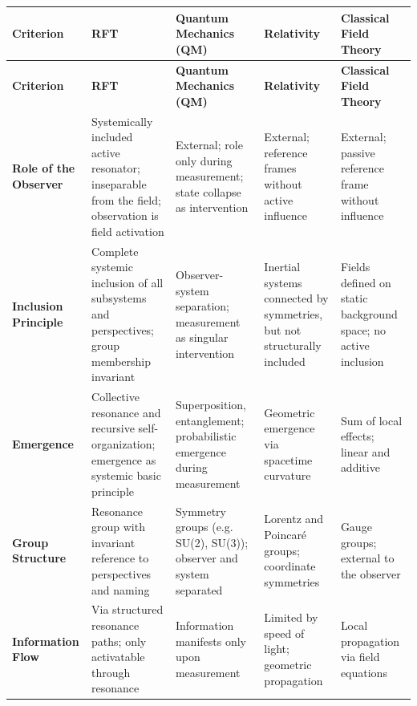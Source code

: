 \documentclass[12pt]{iopart}
\begin{document}
\renewcommand{\arraystretch}{1.3}
\begin{center}
	\begin{longtable}{|p{4cm}|p{3cm}|p{3cm}|p{3cm}|p{3cm}|}
		\hline
		\textbf{Criterion} & \textbf{RFT} & \textbf{Quantum Mechanics (QM)} & \textbf{Relativity} & \textbf{Classical Field Theory} \\
		\hline
		\endfirsthead
		
		\hline
		\textbf{Criterion} & \textbf{RFT} & \textbf{Quantum Mechanics (QM)} & \textbf{Relativity} & \textbf{Classical Field Theory} \\
		\hline
		\endhead
		
		\hline
		\endfoot
		
		\hline
		\endlastfoot
		
		\textbf{Role of the Observer} & Systemically included active resonator; inseparable from the field; observation is field activation & External; role only during measurement; state collapse as intervention & External; reference frames without active influence & External; passive reference frame without influence \\
		\hline
		
		\textbf{Inclusion Principle} & Complete systemic inclusion of all subsystems and perspectives; group membership invariant & Observer-system separation; measurement as singular intervention & Inertial systems connected by symmetries, but not structurally included & Fields defined on static background space; no active inclusion \\
		\hline
		
		\textbf{Emergence} & Collective resonance and recursive self-organization; emergence as systemic basic principle & Superposition, entanglement; probabilistic emergence during measurement & Geometric emergence via spacetime curvature & Sum of local effects; linear and additive \\
		\hline
		
		\textbf{Group Structure} & Resonance group with invariant reference to perspectives and naming & Symmetry groups (e.g. SU(2), SU(3)); observer and system separated & Lorentz and Poincaré groups; coordinate symmetries & Gauge groups; external to the observer \\
		\hline
		
		\textbf{Information Flow} & Via structured resonance paths; only activatable through resonance & Information manifests only upon measurement & Limited by speed of light; geometric propagation & Local propagation via field equations \\
		\hline
		

\end{longtable}
\end{center}
\end{document}
